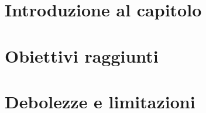 \section{Introduzione al capitolo}

%
%
%
%
%
%
%

\section{Obiettivi raggiunti}

%
%

\section{Debolezze e limitazioni}



